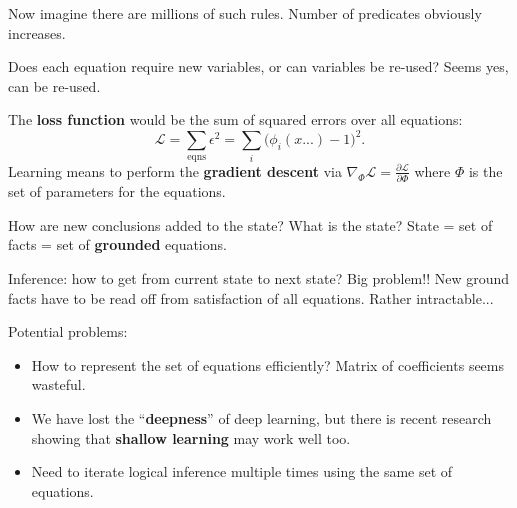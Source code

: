 Now imagine there are millions of such rules.  Number of predicates obviously increases.

Does each equation require new variables, or can variables be re-used? Seems yes, can be re-used.

The \textbf{loss function} would be the sum of squared errors over all equations:
\begin{equation}
\mathcal{L} = \sum_{\mathrm{eqns}} \epsilon^2 = \sum_i \big( \phi_i (x...) - 1 \big)^2 .
\end{equation}
Learning means to perform the \textbf{gradient descent} via $ \nabla_\Phi \mathcal{L} = \frac{\partial \mathcal{L}}{\partial \Phi} $ where $\Phi$ is the set of parameters for the equations.

How are new conclusions added to the state?  What is the state?  State = set of facts = set of \textbf{grounded} equations.

Inference:  how to get from current state to next state?  Big problem!!  New ground facts have to be read off from satisfaction of all equations.  Rather intractable...  

Potential problems:
\begin{itemize}
	\item How to represent the set of equations efficiently?  Matrix of coefficients seems wasteful.
	\item We have lost the ``\textbf{deepness}'' of deep learning, but there is recent research showing that \textbf{shallow learning} may work well too.
	\item Need to iterate logical inference multiple times using the same set of equations.
\end{itemize}

